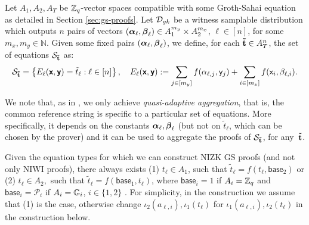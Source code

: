 Let $A_1,A_2,A_T$ be $\mathbb{Z}_q$-vector spaces compatible with some 
Groth-Sahai equation as detailed in Section
\ref{sec:gs-proofs}.  Let $\mathcal{D}_{{gk}}$ be a witness samplable distribution which outputs $n$ pairs of vectors
$({\boldsymbol \alpha}_\ell, {\boldsymbol \beta}_\ell) \in A_1^{m_y} \times A_2^{m_x}$, $\ell \in [n]$, for some 
$m_x,m_y \in \mathbb{N}$. Given some fixed pairs $({\boldsymbol \alpha}_\ell,
{\boldsymbol \beta}_\ell)$, we define, for each $\mathbf{\tilde{t}} \in A_{T}^{n}$, the set of equations $\mathcal{S}_{\mathbf{\tilde{t}}}$ as:
$$\mathcal{S}_{\mathbf{\tilde{t}}}=\left\{ E_{\ell}(\textbf{\textsf{x}},\textbf{\textsf{y}})=\tilde{t}_{\ell}: \ell \in [n]\right\},  \quad 
E_{\ell}(\textbf{\textsf{x}},\textbf{\textsf{y}}):=\sum_{j\in[m_y]} f(\alpha_{\ell,j}, \mathsf{y}_j) + 
\sum_{i\in[m_x]}  f(\mathsf{x}_i, \beta_{\ell,i}).$$  

We note that, as in \cite{C:JutRoy14}, we only achieve \textit{quasi-adaptive aggregation}, that is, the common reference string is specific to a particular set of equations. More specifically, it depends on the constants ${\boldsymbol \alpha}_{\ell},{\boldsymbol \beta}_{\ell}$ (but not on $\tilde{t}_{\ell}$, which can be chosen by the prover) and it can be used to aggregate the proofs of 
$\mathcal{S}_{\mathbf{\tilde{t}}}$, for any~$\mathbf{\tilde{t}}$.  

Given the equation types for which we can construct NIZK GS proofs (and not only NIWI proofs), there always exists (1) $t_{\ell} \in A_1$, such that $\tilde{t}_{\ell}=f(t_{\ell},\mathsf{base}_{2})$ or 
 (2) ${t}_{\ell} \in A_2,$ such that $\tilde{t}_{\ell}=f(\mathsf{base}_{1},t_{\ell})$, where $\mathsf{base}_{i}=1$ if $A_i=\mathbb{Z}_q$ and $\mathsf{base}_i=\mathcal{P}_i$ if $A_i=\mathbb{G}_i$, $i \in \{1,2\}$ \cite{SIAMJC:GroSah12}. For simplicity, 
 in the construction we assume that (1) is the case, otherwise 
 change $\iota_2(a_{\ell,i}),  \iota_1(t_{\ell})$ for $\iota_1(a_{\ell,i}),  \iota_2(t_{\ell})$ in the construction below. 

